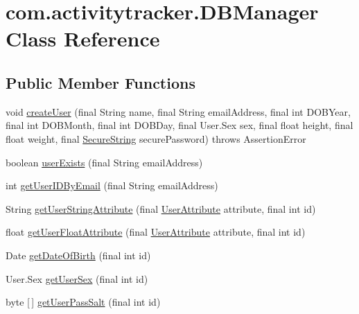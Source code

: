 \hypertarget{classcom_1_1activitytracker_1_1_d_b_manager}{}\section{com.\+activitytracker.\+D\+B\+Manager Class Reference}
\label{classcom_1_1activitytracker_1_1_d_b_manager}
\subsection*{Public Member Functions}
\begin{DoxyCompactItemize}
\item 
void \mbox{\hyperlink{classcom_1_1activitytracker_1_1_d_b_manager_a39ef296348c7bfacf965b3417655f4e5}{create\+User}} (final String name, final String email\+Address, final int D\+O\+B\+Year, final int D\+O\+B\+Month, final int D\+O\+B\+Day, final User.\+Sex sex, final float height, final float weight, final \mbox{\hyperlink{classcom_1_1activitytracker_1_1_secure_string}{Secure\+String}} secure\+Password)  throws Assertion\+Error 
\item 
boolean \mbox{\hyperlink{classcom_1_1activitytracker_1_1_d_b_manager_af05d79f33ecf2920a67d1b9cf82c079f}{user\+Exists}} (final String email\+Address)
\item 
int \mbox{\hyperlink{classcom_1_1activitytracker_1_1_d_b_manager_a195dcdeabdd00facb19d720976dd3f53}{get\+User\+I\+D\+By\+Email}} (final String email\+Address)
\item 
String \mbox{\hyperlink{classcom_1_1activitytracker_1_1_d_b_manager_a20f726c054d6c8a6fc3ce629d87f1114}{get\+User\+String\+Attribute}} (final \mbox{\hyperlink{enumcom_1_1activitytracker_1_1_user_attribute}{User\+Attribute}} attribute, final int id)
\item 
float \mbox{\hyperlink{classcom_1_1activitytracker_1_1_d_b_manager_a98df66254bec4d74b29cfe468a9fc794}{get\+User\+Float\+Attribute}} (final \mbox{\hyperlink{enumcom_1_1activitytracker_1_1_user_attribute}{User\+Attribute}} attribute, final int id)
\item 
Date \mbox{\hyperlink{classcom_1_1activitytracker_1_1_d_b_manager_a0576baf67b45c7d2d0ba369052e4404e}{get\+Date\+Of\+Birth}} (final int id)
\item 
User.\+Sex \mbox{\hyperlink{classcom_1_1activitytracker_1_1_d_b_manager_a4e695c111b877cfd1d918602551f65a1}{get\+User\+Sex}} (final int id)
\item 
byte \mbox{[}$\,$\mbox{]} \mbox{\hyperlink{classcom_1_1activitytracker_1_1_d_b_manager_aeab864b072cc08c0521e80ae1f459ca7}{get\+User\+Pass\+Salt}} (final int id)

\end{DoxyCompactItemize}
